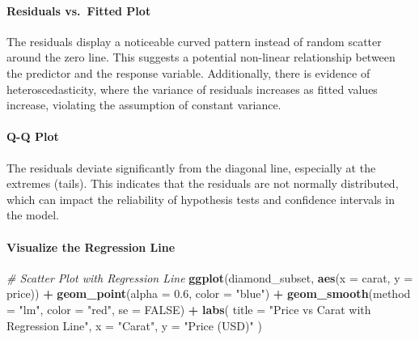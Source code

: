 \documentclass[
]{article}
\newenvironment{Shaded}{\begin{snugshade}}{\end{snugshade}}
\newcommand{\AttributeTok}[1]{\textcolor[rgb]{0.13,0.29,0.53}{#1}}
\newcommand{\CommentTok}[1]{\textcolor[rgb]{0.56,0.35,0.01}{\textit{#1}}}
\newcommand{\ConstantTok}[1]{\textcolor[rgb]{0.56,0.35,0.01}{#1}}
\newcommand{\FloatTok}[1]{\textcolor[rgb]{0.00,0.00,0.81}{#1}}
\newcommand{\FunctionTok}[1]{\textcolor[rgb]{0.13,0.29,0.53}{\textbf{#1}}}
\newcommand{\NormalTok}[1]{#1}
\newcommand{\SpecialCharTok}[1]{\textcolor[rgb]{0.81,0.36,0.00}{\textbf{#1}}}
\newcommand{\StringTok}[1]{\textcolor[rgb]{0.31,0.60,0.02}{#1}}
\begin{document}
\paragraph{Residuals vs.~Fitted Plot}\label{residuals-vs.-fitted-plot}

The residuals display a noticeable curved pattern instead of random
scatter around the zero line. This suggests a potential non-linear
relationship between the predictor and the response variable.
Additionally, there is evidence of heteroscedasticity, where the
variance of residuals increases as fitted values increase, violating the
assumption of constant variance.

\paragraph{Q-Q Plot}\label{q-q-plot}

The residuals deviate significantly from the diagonal line, especially
at the extremes (tails). This indicates that the residuals are not
normally distributed, which can impact the reliability of hypothesis
tests and confidence intervals in the model.

\paragraph{Visualize the Regression
Line}\label{visualize-the-regression-line}

\begin{Shaded}
\begin{Highlighting}[]
\CommentTok{\# Scatter Plot with Regression Line}
\FunctionTok{ggplot}\NormalTok{(diamond\_subset, }\FunctionTok{aes}\NormalTok{(}\AttributeTok{x =}\NormalTok{ carat, }\AttributeTok{y =}\NormalTok{ price)) }\SpecialCharTok{+}
  \FunctionTok{geom\_point}\NormalTok{(}\AttributeTok{alpha =} \FloatTok{0.6}\NormalTok{, }\AttributeTok{color =} \StringTok{"blue"}\NormalTok{) }\SpecialCharTok{+}
  \FunctionTok{geom\_smooth}\NormalTok{(}\AttributeTok{method =} \StringTok{"lm"}\NormalTok{, }\AttributeTok{color =} \StringTok{"red"}\NormalTok{, }\AttributeTok{se =} \ConstantTok{FALSE}\NormalTok{) }\SpecialCharTok{+}
  \FunctionTok{labs}\NormalTok{(}
    \AttributeTok{title =} \StringTok{"Price vs Carat with Regression Line"}\NormalTok{,}
    \AttributeTok{x =} \StringTok{"Carat"}\NormalTok{,}
    \AttributeTok{y =} \StringTok{"Price (USD)"}
\NormalTok{  )}
\end{Highlighting}
\end{Shaded}
\end{document}
